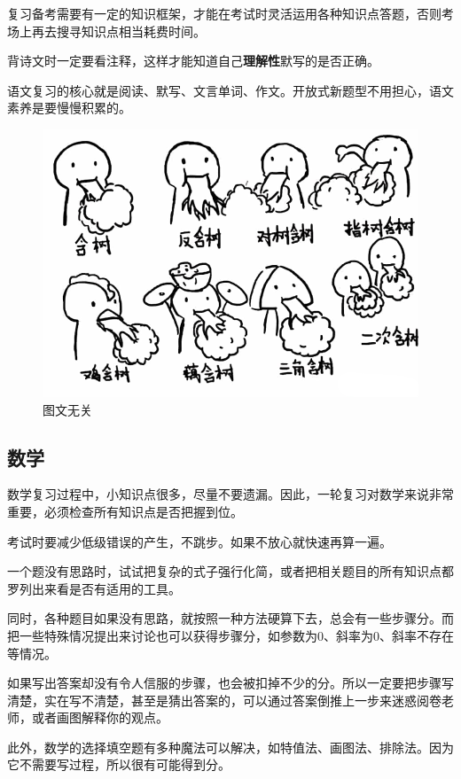 \documentclass[UTF8,11pt,a4paper]{ctexart}
\begin{document}
			复习备考需要有一定的知识框架，才能在考试时灵活运用各种知识点答题，否则考场上再去搜寻知识点相当耗费时间。
			
			背诗文时一定要看注释，这样才能知道自己\textbf{理解性}默写的是否正确。
			
			语文复习的核心就是阅读、默写、文言单词、作文。开放式新题型不用担心，语文素养是要慢慢积累的。
			
			\begin{figure}[h]
				\centering
				\includegraphics[scale=0.4]{1.jpg}
				
				\caption{图文无关}
			\end{figure}
		\subsection{数学}
			数学复习过程中，小知识点很多，尽量不要遗漏。因此，一轮复习对数学来说非常重要，必须检查所有知识点是否把握到位。
			
			考试时要减少低级错误的产生，不跳步。如果不放心就快速再算一遍。
			
			一个题没有思路时，试试把复杂的式子强行化简，或者把相关题目的所有知识点都罗列出来看是否有适用的工具。
			
			同时，各种题目如果没有思路，就按照一种方法硬算下去，总会有一些步骤分。而把一些特殊情况提出来讨论也可以获得步骤分，如参数为0、斜率为0、斜率不存在等情况。
			
			如果写出答案却没有令人信服的步骤，也会被扣掉不少的分。所以一定要把步骤写清楚，实在写不清楚，甚至是猜出答案的，可以通过答案倒推上一步来迷惑阅卷老师，或者画图解释你的观点。
			
			此外，数学的选择填空题有多种魔法可以解决，如特值法、画图法、排除法。因为它不需要写过程，所以很有可能得到分。
\end{document}
